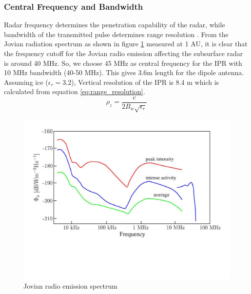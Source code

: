 \subsubsection{Central Frequency and Bandwidth}
Radar frequency determines the penetration capability of the radar, while bandwidth of the transmitted pulse determines range resolution \cite{penetrartion}. From the Jovian radiation spectrum as shown in figure \ref{fig:Jovian_radio_emission} measured at 1 AU, it is clear that the frequency cutoff for the Jovian radio emission affecting the subsurface radar is around 40 MHz. So, we choose 45 MHz as central frequency for the \ac{IPR} with 10 MHz bandwidth (40-50 MHz). This gives 3.6m length for the dipole antenna. Assuming ice ($\epsilon_{r} = 3.2$), Vertical resolution of the \ac{IPR} is 8.4 m which is calculated from equation \ref{eq:range_resolution}.
%
\begin{equation}
\rho_{z} = \dfrac{c}{2B_{w}\sqrt{\epsilon_{r}}}
\label{eq:range_resolution}
\end{equation}
%
\begin{figure}[bht]
\centering
\includegraphics[scale=0.5]{Figures/Jovian_radio_emission.pdf}
\caption{Jovian radio emission spectrum \cite{Gany_SRS}} 
\label{fig:Jovian_radio_emission}
\end{figure}
%
